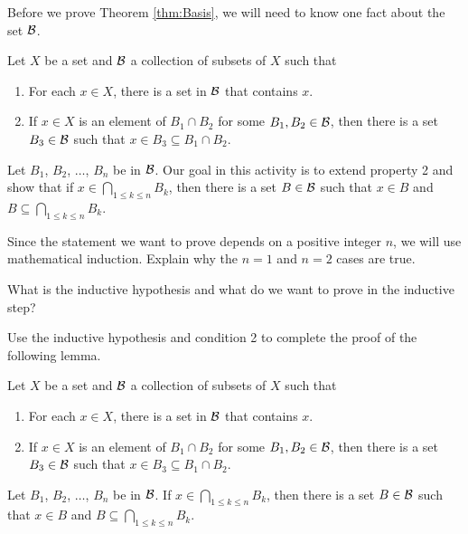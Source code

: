 Before we prove Theorem \ref{thm:Basis}, we will need to know one fact about the set $\mathcal{B}$. 

\begin{activity} \label{act:Basis} Let $X$ be a set and $\mathcal{B}$ a collection of subsets of $X$ such that
\begin{enumerate}
\item For each $x \in X$, there is a set in $\mathcal{B}$ that contains $x$.
\item If $x \in X$ is an element of $B_1 \cap B_2$ for some $B_1, B_2 \in \mathcal{B}$, then there is a set $B_3 \in \mathcal{B}$ such that $x \in B_3 \subseteq B_1 \cap B_2$. 
\end{enumerate}
Let $B_1$, $B_2$, $\ldots$, $B_n$ be in $\mathcal{B}$. Our goal in this activity is to extend property 2 and show that if $x \in \bigcap_{1 \leq k \leq n} B_k$, then there is a set $B \in \mathcal{B}$ such that $x \in B$ and $B \subseteq \bigcap_{1 \leq k \leq n} B_k$. 
\ba
\item Since the statement we want to prove depends on a positive integer $n$, we will use mathematical induction. Explain why the $n=1$ and $n=2$ cases are true.

\item What is the inductive hypothesis and what do we want to prove in the inductive step? 

\item Use the inductive hypothesis and condition 2 to complete the proof of the following lemma.

\begin{lemma} \label{lem:Basis} Let $X$ be a set and $\mathcal{B}$ a collection of subsets of $X$ such that
\begin{enumerate}
\item For each $x \in X$, there is a set in $\mathcal{B}$ that contains $x$.
\item If $x \in X$ is an element of $B_1 \cap B_2$ for some $B_1, B_2 \in \mathcal{B}$, then there is a set $B_3 \in \mathcal{B}$ such that $x \in B_3 \subseteq B_1 \cap B_2$. 
\end{enumerate}
Let $B_1$, $B_2$, $\ldots$, $B_n$ be in $\mathcal{B}$. If $x \in \bigcap_{1 \leq k \leq n} B_k$, then there is a set $B \in \mathcal{B}$ such that $x \in B$ and $B \subseteq \bigcap_{1 \leq k \leq n} B_k$. 
\end{lemma}

\ea

\end{activity}

